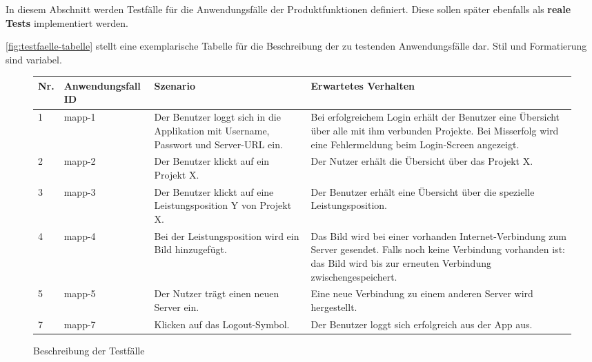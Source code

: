 \begin{tcolorbox}
In diesem Abschnitt werden Testfälle für die Anwendungsfälle der Produktfunktionen definiert.
Diese sollen später ebenfalls als \textbf{reale Tests} implementiert werden.

\autoref{fig:testfaelle-tabelle} stellt eine exemplarische Tabelle für die Beschreibung der zu testenden Anwendungsfälle dar. 
Stil und Formatierung sind variabel.
\end{tcolorbox}

\begin{figure}[!h]
	\begin{center}
		\begin{tabularx}{\textwidth}{ p{} | p{} | p{} | X }
			\textbf{Nr.} & \textbf{Anwendungsfall ID} & \textbf{Szenario} & \textbf{Erwartetes Verhalten} \\ \hline
			1 & mapp-1 & Der Benutzer loggt sich in die Applikation mit Username, Passwort und Server-URL ein. & Bei erfolgreichem Login erhält der Benutzer eine Übersicht über alle mit ihm verbunden Projekte. Bei Misserfolg wird eine Fehlermeldung beim Login-Screen angezeigt. \\ \hline
			2 & mapp-2 & Der Benutzer klickt auf ein Projekt X. & Der Nutzer erhält die Übersicht über das Projekt X. \\ \hline
			3 & mapp-3 & Der Benutzer klickt auf eine Leistungsposition Y von Projekt X. & Der Benutzer erhält eine Übersicht über die spezielle Leistungsposition. \\ \hline
			4 & mapp-4 & Bei der Leistungsposition wird ein Bild hinzugefügt. & Das Bild wird bei einer vorhanden Internet-Verbindung zum Server gesendet. Falls noch keine Verbindung vorhanden ist: das Bild wird bis zur erneuten Verbindung zwischengespeichert. \\ \hline
			5 & mapp-5 & Der Nutzer trägt einen neuen Server ein. & Eine neue Verbindung zu einem anderen Server wird hergestellt. \\ \hline
			7 & mapp-7 & Klicken auf das Logout-Symbol. & Der Benutzer loggt sich erfolgreich aus der App aus. \\ \hline
		\end{tabularx}	
	\end{center}
	\caption{Beschreibung der Testfälle}
	\label{fig:testfaelle-tabelle}
\end{figure}

